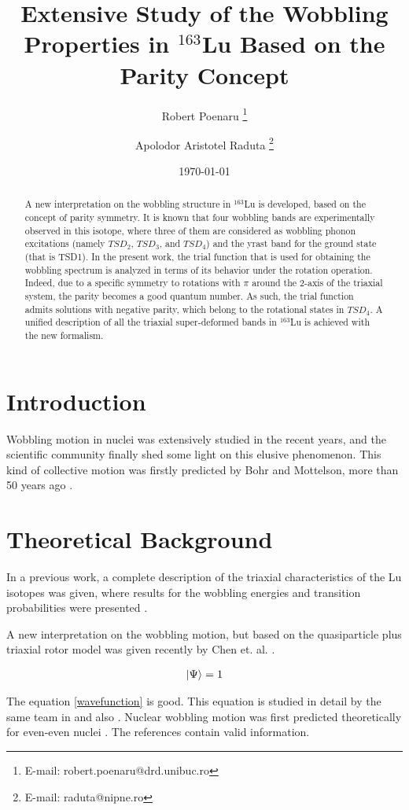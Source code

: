 \documentclass[12pt]{article}
\title{Extensive Study of the Wobbling Properties in $^{163}$Lu Based on the Parity Concept}
\author[1,2]{Robert Poenaru \thanks{E-mail: robert.poenaru@drd.unibuc.ro}}
\author[2,3]{Apolodor Aristotel Raduta \thanks{E-mail: raduta@nipne.ro}}
\affil[1]{Doctoral School of Physics, University of Bucharest, Romania}
\affil[2]{\textit{Horia Hulubei} National Institute for Physics and Nuclear Engineering, M\u{a}gurele-Bucharest, Romania}
\affil[3]{Academy of Romanian Scientists, Bucharest, Romania}
\date{\today}
\begin{document}


\maketitle

\begin{abstract}
A new interpretation on the wobbling structure in $^{163}$Lu is developed, based on the concept of parity symmetry. It is known that four wobbling bands are experimentally observed in this isotope, where three of them are considered as wobbling phonon excitations (namely $TSD_2$, $TSD_3$, and $TSD_4$) and the yrast band for the ground state (that is TSD1). In the present work, the trial function that is used for obtaining the wobbling spectrum is analyzed in terms of its behavior under the rotation operation. Indeed, due to a specific symmetry to rotations with $\pi$ around the 2-axis of the triaxial system, the parity becomes a good quantum number. As such, the trial function admits solutions with negative parity, which belong to the rotational states in $TSD_4$. A unified description of all the triaxial super-deformed bands in $^{163}$Lu is achieved with the new formalism.
\end{abstract}

\section{Introduction}
Wobbling motion in nuclei was extensively studied in the recent years, and the scientific community finally shed some light on this elusive phenomenon. This kind of collective motion was firstly predicted by Bohr and Mottelson, more than 50 years ago \cite{bohr1998nuclear}.

\section{Theoretical Background}

In a previous work, a complete description of the triaxial characteristics of the Lu isotopes was given, where results for the wobbling energies and transition probabilities were presented \cite{raduta2018wobbling}.

A new interpretation on the wobbling motion, but based on the quasiparticle plus triaxial rotor model was given recently by Chen et. al. \cite{chen2020interpretation}.

\begin{align}
    \ket{\Psi}=1
    \label{wavefunction}
\end{align}

The equation \ref{wavefunction} is good. This equation is studied in detail by the same team in \cite{raduta2018wobbling} and also \cite{raduta2020new}.
Nuclear wobbling motion was first predicted theoretically for even-even nuclei \cite{bohr1998nuclear}. The references \cite{bohr1998nuclear,raduta2018wobbling,chen2020interpretation,raduta2020new} contain valid information.


\end{document}

